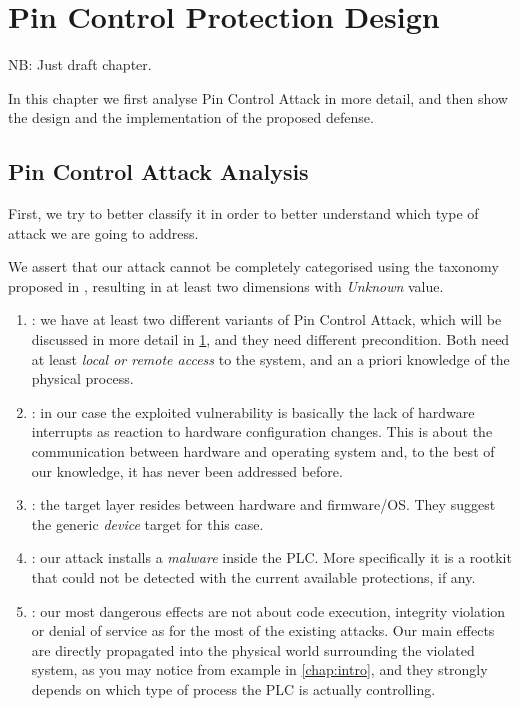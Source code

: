 \chapter{Pin Control Protection Design}
\label{chap:design}

{\color{red}NB: Just draft chapter.}

In this chapter we first analyse Pin Control Attack in more detail, and then show the design and the implementation of the proposed defense.

\section{Pin Control Attack Analysis}

First, we try to better classify it in order to better understand which type of attack we are going to address.

We assert that our attack cannot be completely categorised using the taxonomy proposed in \cite{taxonomy}, resulting in at least two dimensions with \emph{Unknown} value.
\begin{enumerate}
	\item {}: we have at least two different variants of Pin Control Attack, which will be discussed in more detail in \chap \ref{chap:design},
		and they need different precondition. Both need at least \emph{local or remote access} to the system, and an a priori knowledge of the physical process.
	\item {}: in our case the exploited vulnerability is basically the lack of hardware interrupts as reaction to hardware configuration changes.
		This is about the communication between hardware and operating system and, to the best of our knowledge, it has never been addressed before.
	\item {}: the target layer resides between hardware and firmware/OS. They suggest the generic \emph{device} target for this case.
	\item {}: our attack installs a \emph{malware} inside the PLC. More specifically it is a rootkit that could not be detected
		with the current available protections, if any.
	\item {}: our most dangerous effects are not about code execution, integrity violation or denial of service as for the most of the existing attacks.
		Our main effects are directly propagated into the physical world surrounding the violated system, as you may notice from example in \chap \ref{chap:intro},
		and they strongly depends on which type of process the PLC is actually controlling.
\end{enumerate}

